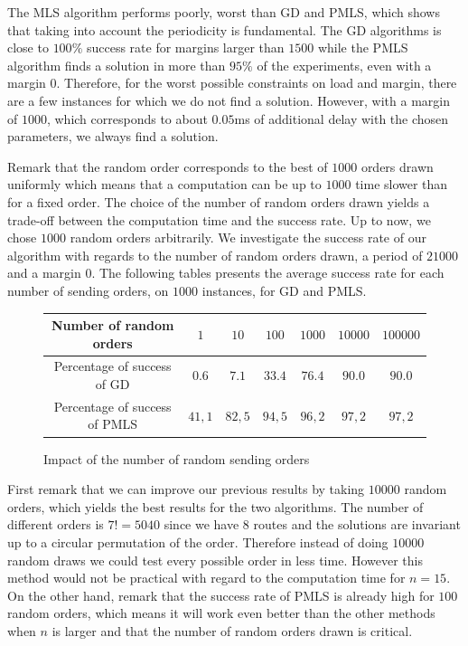 \documentclass[a4paper,10pt]{article}
\begin{document}
{     The MLS algorithm performs poorly, worst than GD and PMLS, which shows that taking into account the periodicity is fundamental.
     The GD algorithms is close to $100\%$ success rate for margins larger than $1500$ while the PMLS algorithm finds a solution in more than $95\%$ of the experiments, even with a margin $0$. Therefore, for the worst possible constraints on load and margin, there are a few instances for which we do not find a solution. However, with a margin of $1000$, which corresponds to about $0.05$ms of additional delay with the chosen parameters, we always find a solution. 
     
    Remark that the random order corresponds to the best of $1000$ orders drawn uniformly which means that a computation can be up to $1000$ time slower than for a fixed order. The choice of the number of random orders drawn yields a trade-off between the computation time and the success rate. Up to now, we chose $1000$ random orders arbitrarily. We investigate the success rate of our algorithm with regards to the number of random orders drawn, a period of $21000$ and a margin $0$. The following tables presents the average success rate for each number of sending orders, on $1000$ instances, for GD and PMLS.

         \begin{figure}[H] 
       \begin{center}
   \begin{tabular}{|c|c|c|c|c|c|c|}
    \hline
    Number of random orders & $1$ & $10$ & $100$& $1 000$& $10 000$&$100 000$\\
    \hline
    Percentage of success of GD & $0.6$ &$7.1$&$33.4$&$76.4$&$90.0$&$90.0$\\
    \hline
    Percentage of success of PMLS & $41,1$ &$82,5$&$94,5$&$96,2$&$97,2$&$97,2$\\
    \hline
      \end{tabular}
      \end{center}
   \caption{Impact of the number of random sending orders}
     \end{figure}
     
First remark that we can improve our previous results by taking $10000$ random orders, which 
yields the best results for the two algorithms. The number of different orders is $7!= 5040$ since we have $8$ routes and the solutions are invariant up to a circular permutation of the order. Therefore instead of doing $10000$ random draws we could test every possible order in less time. However this method would not be practical with regard to the computation time for $n = 15$. On the other hand, remark that the success rate of PMLS is already high for $100$ random orders, which means it will work even better than the other methods when $n$ is larger and that the number of random orders drawn is critical.
     
}
\end{document}

